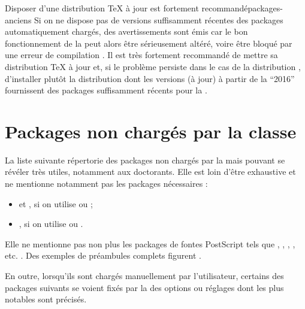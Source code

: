 \begin{dbremark}{Disposer d'une distribution \TeX{} à jour est fortement
    recommandé}{packages-anciens}
  Si on ne dispose pas de versions suffisamment récentes des packages
  automatiquement chargés, des avertissements sont émis car le bon
  fonctionnement de la \yatCl{} peut alors être sérieusement altéré, voire être
  bloqué par une erreur de compilation . Il
  est très fortement recommandé de mettre sa distribution \TeX{} à jour et, si
  le problème persiste dans le cas de la distribution \miktex{},
  d'installer plutôt la distribution \texlive{} dont les versions (à
  jour) à partir de la \enquote{2016} fournissent des packages suffisamment
  récents pour la \yatCl{}.
\end{dbremark}

\section{Packages non chargés par la classe}\label{sec-packages-non-charges}

La liste suivante répertorie des packages non chargés par la \yatCl{} mais
pouvant se révéler très utiles, notamment aux doctorants.  Elle est loin d'être
exhaustive et ne mentionne notamment pas les packages nécessaires :
\begin{itemize}
\item {} et , si on utilise
   ou
   ;
\item {}, si on utilise
   ou
  .
\end{itemize}
Elle ne mentionne pas non plus les packages de
fontes PostScript tels que
, , , ,
etc. . Des exemples de préambules complets figurent
.

En outre, lorsqu'ils sont chargés manuellement par l'utilisateur, certains des
packages suivants se voient fixés par la \yatCl{} des options ou réglages dont
les plus notables sont précisés.

